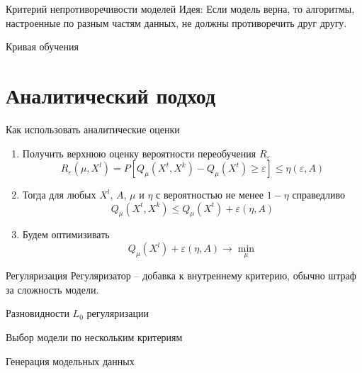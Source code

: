 \documentclass[10pt]{beamer}
\begin{document}
\begin{frame}{Критерий непротиворечивости моделей}  
  \alert{Идея}: Если модель верна, то алгоритмы, настроенные по разным частям данных, не должны противоречить друг другу.\\
\end{frame}

{
\begin{frame}{Кривая обучения}  
\end{frame}
}

\section{Аналитический подход}

\begin{frame}{Как использовать аналитические оценки}  
  \begin{enumerate}
    \item Получить верхнюю оценку вероятности переобучения $R_{\varepsilon}$\\
      $$R_{\varepsilon}(\mu, X^l) = P[Q_{\mu}(X^t, X^k) - Q_{\mu}(X^t) \geq \varepsilon] \leq \eta(\varepsilon, A)$$
    \item Тогда для любых $X^l$, $A$, $\mu$ и $\eta$ с вероятностью не менее $1-\eta$ справедливо\\
      $$Q_{\mu}(X^t, X^k) \leq Q_{\mu}(X^t) + \varepsilon(\eta, A)$$
    \item Будем оптимизивать \\
      $$Q_{\mu}(X^l) + \varepsilon(\eta, A) \rightarrow \min\limits_{\mu}$$
  \end{enumerate}
\end{frame}

\begin{frame}{Регуляризация}  
  Регуляризатор -- добавка к внутреннему критерию, обычно штраф за сложность модели.\\
\end{frame}

\begin{frame}{Разновидности $L_0$ регуляризации}  
\end{frame}

\begin{frame}{Выбор модели по нескольким критериям}  
\end{frame}

\begin{frame}{Генерация модельных данных}  

\end{frame}
\end{document}
